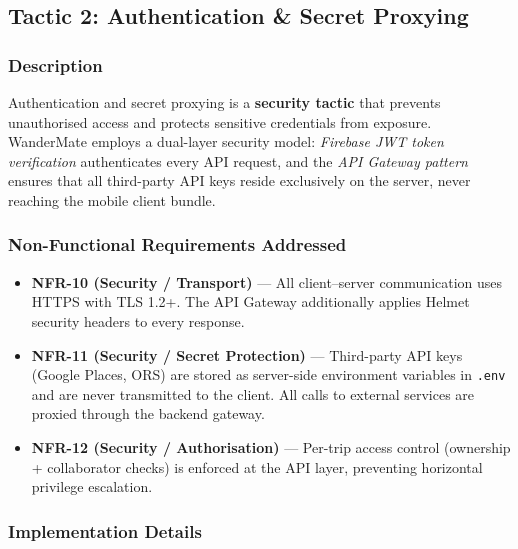 \documentclass[12pt, a4paper]{article}
\newcommand{\code}[1]{\texttt{\small #1}}
\begin{document}
\subsection{Tactic 2: Authentication \& Secret Proxying}

\subsubsection{Description}

Authentication and secret proxying is a \textbf{security tactic} that prevents unauthorised access and protects sensitive credentials from exposure. WanderMate employs a dual-layer security model: \emph{Firebase JWT token verification} authenticates every API request, and the \emph{API Gateway pattern} ensures that all third-party API keys reside exclusively on the server, never reaching the mobile client bundle.

\subsubsection{Non-Functional Requirements Addressed}

\begin{itemize}
  \item \textbf{NFR-10 (Security / Transport)} --- All client--server communication uses HTTPS with TLS 1.2+. The API Gateway additionally applies Helmet security headers to every response.
  \item \textbf{NFR-11 (Security / Secret Protection)} --- Third-party API keys (Google Places, ORS) are stored as server-side environment variables in \code{.env} and are never transmitted to the client. All calls to external services are proxied through the backend gateway.
  \item \textbf{NFR-12 (Security / Authorisation)} --- Per-trip access control (ownership + collaborator checks) is enforced at the API layer, preventing horizontal privilege escalation.
\end{itemize}

\subsubsection{Implementation Details}
\end{document}
